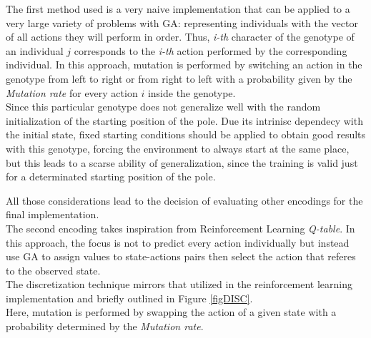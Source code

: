 The first method used is a very naive implementation that can be applied to a very large variety of problems with GA: representing individuals with the vector of all actions they will perform in order.
Thus, \textit{i-th} character of the genotype of an individual $j$ corresponds to the \textit{i-th} action performed by the corresponding individual.
In this approach, mutation is performed by switching an action in the genotype from left to right or from right to left with a probability given by the \textit{Mutation rate} for every action $i$ inside the genotype.
\\
Since this particular genotype does not generalize well with the random initialization of the starting position of the pole. Due its intrinisc dependecy with the initial state, fixed starting conditions should be applied to obtain good results with this genotype, forcing the environment to always start at the same place, but this leads to a scarse ability of generalization, since the training is valid just for a determinated starting position of the pole.

All those considerations lead to the decision of evaluating other encodings for the final implementation.\\

The second encoding takes inspiration from Reinforcement Learning \textit{Q-table}.
In this approach, the focus is not to predict every action individually  but instead use GA to assign values to state-actions pairs then select the action that referes to the observed state.\\
The discretization technique mirrors that utilized in the reinforcement learning implementation and briefly outlined in Figure \ref{figDISC}.\\
Here, mutation is performed by swapping the action of a given state with a probability determined by the \textit{Mutation rate}.


